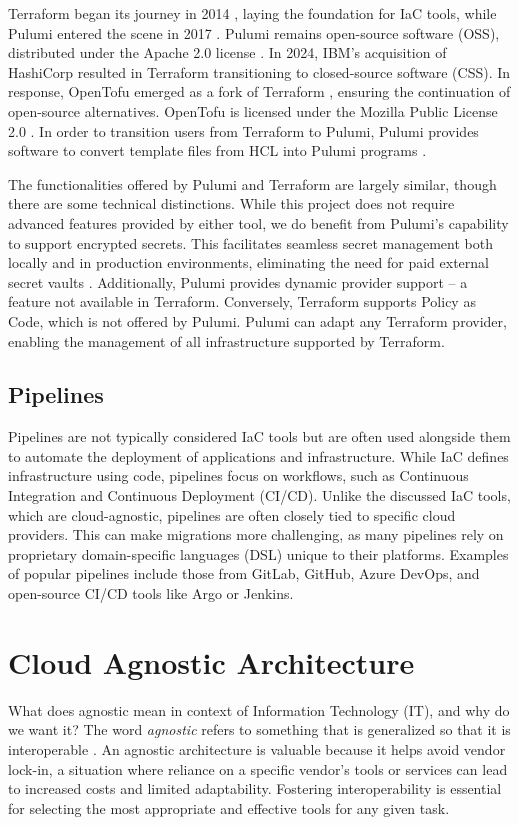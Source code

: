Terraform began its journey in 2014 \Parencite{hashicorpTerraform}, laying the foundation for IaC tools, while Pulumi entered the scene in 2017 \Parencite{pulumiAbout}. Pulumi remains open-source software (OSS), distributed under the Apache 2.0 license \Parencite{pulumiLicense2025}. In 2024, IBM's acquisition of HashiCorp resulted in Terraform transitioning to closed-source software (CSS). In response, OpenTofu emerged as a fork of Terraform \Parencite{opentofu}, ensuring the continuation of open-source alternatives. OpenTofu is licensed under the Mozilla Public License 2.0 \Parencite{opentofuLicense2025}. In order to transition users from Terraform to Pulumi, Pulumi provides software to convert template files from HCL into Pulumi programs \Parencite{pulumiMigration2025}.

The functionalities offered by Pulumi and Terraform are largely similar, though there are some technical distinctions. While this project does not require advanced features provided by either tool, we do benefit from Pulumi's capability to support encrypted secrets. This facilitates seamless secret management both locally and in production environments, eliminating the need for paid external secret vaults \Parencite{pulumi_vs_terraform}. Additionally, Pulumi provides dynamic provider support -- a feature not available in Terraform. Conversely, Terraform supports Policy as Code, which is not offered by Pulumi. Pulumi can adapt any Terraform provider, enabling the management of all infrastructure supported by Terraform.

\subsection{Pipelines}
Pipelines are not typically considered IaC tools but are often used alongside them to automate the deployment of applications and infrastructure. While IaC defines infrastructure using code, pipelines focus on workflows, such as Continuous Integration and Continuous Deployment (CI/CD). Unlike the discussed IaC tools, which are cloud-agnostic, pipelines are often closely tied to specific cloud providers. This can make migrations more challenging, as many pipelines rely on proprietary domain-specific languages (DSL) unique to their platforms. Examples of popular pipelines include those from GitLab, GitHub, Azure DevOps, and open-source CI/CD tools like Argo or Jenkins.

\section{Cloud Agnostic Architecture}
What does agnostic mean in context of Information Technology (IT), and why do we want it? The word \textit{agnostic} refers to something that is generalized so that it is interoperable \Parencite{techtarget_agnostic_definition}. An agnostic architecture is valuable because it helps avoid vendor lock-in, a situation where reliance on a specific vendor's tools or services can lead to increased costs and limited adaptability. Fostering interoperability is essential for selecting the most appropriate and effective tools for any given task.

